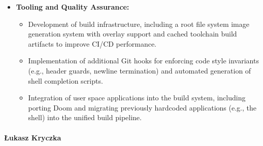 \documentclass[a4paper,10pt,twoside]{report}
\theoremstyle{definition}
\begin{document}
\begin{itemize}
    \item \textbf{Tooling and Quality Assurance:}
    \begin{itemize}
        \item Development of build infrastructure, including a root file system image generation system with overlay support and cached toolchain build artifacts to improve CI/CD performance.
        \item Implementation of additional Git hooks for enforcing code style invariants (e.g., header guards, newline termination) and automated generation of shell completion scripts.
        \item Integration of user space applications into the build system, including porting Doom and migrating previously hardcoded applications (e.g., the shell) into the unified build pipeline.
    \end{itemize}

\end{itemize}

\paragraph{Łukasz Kryczka}
\end{document}
